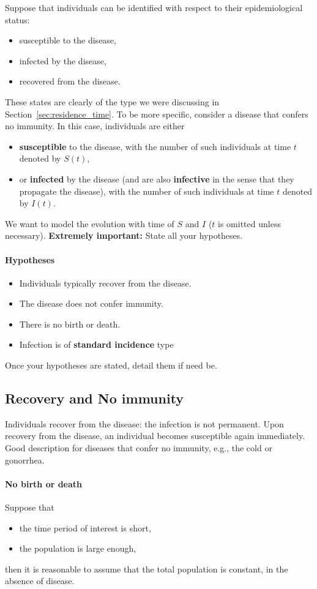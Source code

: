 Suppose that individuals can be identified with respect to their epidemiological status:
\begin{itemize}
\item susceptible to the disease,
\item infected by the disease,
\item recovered from the disease.
\end{itemize}
These states are clearly of the type we were discussing in Section~\ref{sec:residence_time}.
To be more specific, consider a disease that confers no immunity. In this case,
individuals are either
\begin{itemize}
\item \textbf{susceptible} to the disease, with the number of such individuals at time $t$ denoted by $S(t)$,
\item or \textbf{infected} by the disease (and are also \textbf{infective} in the sense that they propagate the disease), with the number of such individuals at time $t$ denoted by $I(t)$.
\end{itemize}
We want to model the evolution with time of $S$ and $I$ ($t$ is omitted unless
necessary).
{\bf Extremely important:} State all your hypotheses.


\paragraph{Hypotheses}
\begin{itemize}
\item Individuals typically recover from the disease.
\item The disease does not confer immunity.
\item There is no birth or death.
\item Infection is of \textbf{standard incidence} type
\end{itemize}
Once your hypotheses are stated, detail them if need be.


\subsection*{Recovery and No immunity}
Individuals recover from the disease: the infection is not permanent.
Upon recovery from the disease, an individual becomes susceptible again
immediately.
Good description for diseases that confer no immunity, e.g., the cold or gonorrhea.

\paragraph{No birth or death}
Suppose that
\begin{itemize}
\item the time period of interest is short,
\item the population is large enough,
\end{itemize}
then it is reasonable to assume that the total population is constant, in the absence of disease.

